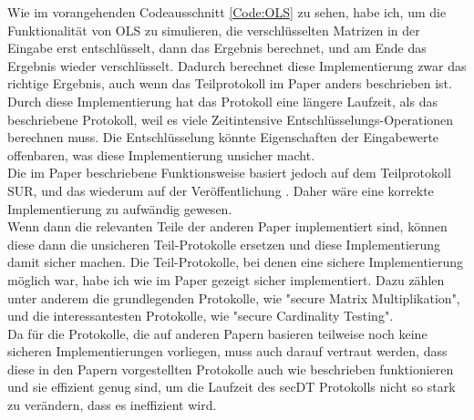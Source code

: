 Wie im vorangehenden Codeausschnitt \ref{Code:OLS} zu sehen, habe ich, um die Funktionalität von OLS zu simulieren, die verschlüsselten Matrizen in der Eingabe erst entschlüsselt, dann das Ergebnis berechnet, und am Ende das Ergebnis wieder verschlüsselt. Dadurch berechnet diese Implementierung zwar das richtige Ergebnis, auch wenn das Teilprotokoll im Paper \cite{Doettling2021} anders beschrieben ist. Durch diese Implementierung hat das Protokoll eine längere Laufzeit, als das beschriebene Protokoll, weil es viele Zeitintensive Entschlüsselungs-Operationen berechnen muss. Die Entschlüsselung könnte Eigenschaften der Eingabewerte offenbaren, was diese Implementierung unsicher macht.\\
Die im Paper beschriebene Funktionsweise basiert jedoch auf dem Teilprotokoll SUR, und das wiederum auf der Veröffentlichung \cite{Schoenmakers}. Daher wäre eine korrekte Implementierung zu aufwändig gewesen.\\
Wenn dann die relevanten Teile der anderen Paper implementiert sind, können diese dann die unsicheren Teil-Protokolle ersetzen und diese Implementierung damit sicher machen.
Die Teil-Protokolle, bei denen eine sichere Implementierung möglich war, habe ich wie im Paper gezeigt sicher implementiert. Dazu zählen unter anderem die grundlegenden Protokolle, wie "secure Matrix Multiplikation", und die interessantesten Protokolle, wie "secure Cardinality Testing".\\
Da für die Protokolle, die auf anderen Papern basieren teilweise noch keine sicheren Implementierungen vorliegen, muss auch darauf vertraut werden, dass diese in den Papern vorgestellten Protokolle auch wie beschrieben funktionieren und sie effizient genug sind, um die Laufzeit des secDT Protokolls nicht so stark zu verändern, dass es ineffizient wird.\\


